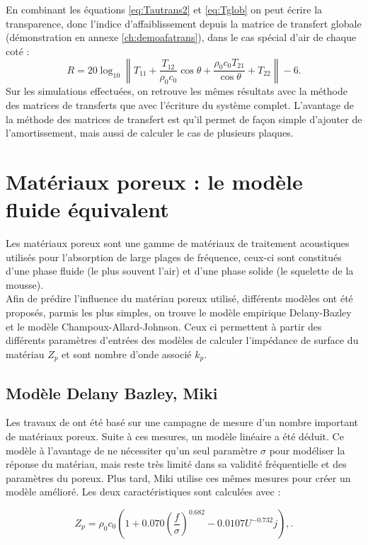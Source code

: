 \documentclass[12pt,foolscap]{report}
\begin{document}
	En combinant les équations \ref{eq:Tautrans2} et \ref{eq:Tglob} on peut écrire la transparence, donc l'indice d'affaiblissement depuis la matrice de transfert globale  (démonstration en annexe \ref{ch:demoafatrans}), dans le cas spécial d'air de chaque coté :
	\begin{equation}
	R = 20 \log_{10} \left\|T_{11}+\frac{T_{12}}{\rho_0 c_0}\cos\theta+\frac{\rho_0 c_0T_{21}}{\cos\theta}+T_{22}\right\|-6 \text{.}
	\end{equation}
	Sur les simulations effectuées, on retrouve les mêmes résultats avec la méthode des matrices de transferts que avec l'écriture du système complet. L'avantage de la méthode des matrices de transfert est qu'il permet de façon simple d'ajouter de l'amortissement, mais aussi de calculer le cas de plusieurs plaques.
	
	\section{Matériaux poreux : le modèle fluide équivalent}
	Les matériaux poreux sont une gamme de matériaux de traitement acoustiques utilisés pour l'absorption de large plages de fréquence, ceux-ci sont constitués d'une phase fluide (le plus souvent l'air) et d'une phase solide (le squelette de la mousse).\\
	Afin de prédire l'influence du matériau poreux utilisé, différents modèles ont été proposés, parmis les plus simples, on trouve le modèle empirique Delany-Bazley et le modèle Champoux-Allard-Johnson. Ceux ci permettent à partir des différents paramètres d'entrées des modèles de calculer l'impédance de surface du matériau $Z_p$ et sont nombre d'onde associé $k_p$.
	
	\subsection{Modèle Delany Bazley, Miki}
	Les travaux de \cite{delany_acoustical_1970}  ont été basé sur une campagne de mesure d'un nombre important de matériaux poreux. Suite à ces mesures, un modèle linéaire a été déduit. Ce modèle à l'avantage de ne nécessiter qu'un seul paramètre $\sigma$ pour modéliser la réponse du matériau, mais reste très limité dans sa validité fréquentielle et des paramètres du poreux. Plus tard, Miki utilise ces mêmes mesures  \cite{miki1990acoustical} pour créer un modèle amélioré. Les deux caractéristiques sont calculées avec :
	
	\begin{equation}
	Z_p = \rho_0 c_0 (1 + 0.070 (\frac{f}{\sigma})^{0.682}- 0.0107 U ^{-0.732}j),\text{.}
	\end{equation}
	
\end{document}
